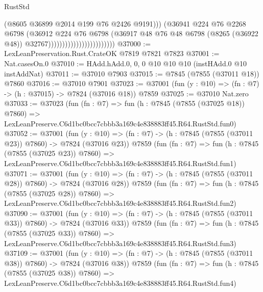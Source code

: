 \begin{lexlean}{RustStd}
\begin{coremodule}
                                                  (@8605 @36899 @2014 @199 @76 @2426 @9191)))
                                              (@36941
                                                @224
                                                @76
                                                @2268
                                                @6798
                                                (@36912
                                                  @224
                                                  @76
                                                  @6798
                                                  (@36917
                                                    @48
                                                    @76
                                                    @48
                                                    @6798
                                                    (@8265 (@36922 @48))
                                                    @32767))))))))))))))))))))))))
@37000 := LexLeanPreservation.Rust.CrateOK @7819 @7821 @7823
@37001 := Nat.casesOn.{0}
@37010 := HAdd.hAdd.{0, 0, 0} @10 @10 @10 (instHAdd.{0} @10 instAddNat)
@37011 := @37010 @7903
@37015 := @7845 (@7855 (@37011 @18)) @7860
@37016 := @37010 @7901
@37023 := @37001 (fun (y : @10) => (fn : @7) -> (h : @37015) -> @7824 (@37016 @18)) @7859
@37025 := @37010 Nat.zero
@37033 := @37023
    (fun (fn : @7) =>
    fun (h : @7845 (@7855 (@37025 @18)) @7860) =>
    LexLeanPreserve.C6d1bc0bcc7cbbb3a169c4e838883ff45.R64.RustStd.fun0)
@37052 := @37001
    (fun (y : @10) => (fn : @7) -> (h : @7845 (@7855 (@37011 @23)) @7860) -> @7824 (@37016 @23))
    @7859
    (fun (fn : @7) =>
    fun (h : @7845 (@7855 (@37025 @23)) @7860) =>
    LexLeanPreserve.C6d1bc0bcc7cbbb3a169c4e838883ff45.R64.RustStd.fun1)
@37071 := @37001
    (fun (y : @10) => (fn : @7) -> (h : @7845 (@7855 (@37011 @28)) @7860) -> @7824 (@37016 @28))
    @7859
    (fun (fn : @7) =>
    fun (h : @7845 (@7855 (@37025 @28)) @7860) =>
    LexLeanPreserve.C6d1bc0bcc7cbbb3a169c4e838883ff45.R64.RustStd.fun2)
@37090 := @37001
    (fun (y : @10) => (fn : @7) -> (h : @7845 (@7855 (@37011 @33)) @7860) -> @7824 (@37016 @33))
    @7859
    (fun (fn : @7) =>
    fun (h : @7845 (@7855 (@37025 @33)) @7860) =>
    LexLeanPreserve.C6d1bc0bcc7cbbb3a169c4e838883ff45.R64.RustStd.fun3)
@37109 := @37001
    (fun (y : @10) => (fn : @7) -> (h : @7845 (@7855 (@37011 @38)) @7860) -> @7824 (@37016 @38))
    @7859
    (fun (fn : @7) =>
    fun (h : @7845 (@7855 (@37025 @38)) @7860) =>
    LexLeanPreserve.C6d1bc0bcc7cbbb3a169c4e838883ff45.R64.RustStd.fun4)

\end{coremodule}
\end{lexlean}
